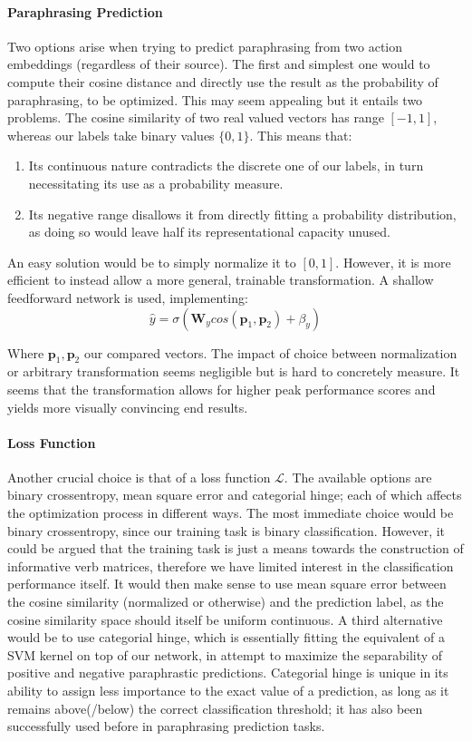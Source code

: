 \documentclass[a4paper,11pt]{article}
\begin{document}
\paragraph{Paraphrasing Prediction}
Two options arise when trying to predict paraphrasing from two action embeddings (regardless of their source). The first and simplest one would to compute their cosine distance and directly use the result as the probability of paraphrasing, to be optimized. This may seem appealing but it entails two problems. The cosine similarity of two real valued vectors has range $[-1,1]$, whereas our labels take binary values $\{0,1\}$. This means that:
\begin{enumerate}
\item Its continuous nature contradicts the discrete one of our labels, in turn necessitating its use as a probability measure. 
\item Its negative range disallows it from directly fitting a probability distribution, as doing so would leave half its representational capacity unused.
\end{enumerate}

An easy solution would be to simply normalize it to $[0,1]$. However, it is more efficient to instead allow a more general, trainable transformation. A shallow feedforward network is used, implementing:
\[
\hat{y} = \sigma(\mathbf{W}_ycos(\mathbf{p}_1,\mathbf{p}_2) + \beta_y) 
\]
 
Where $\mathbf{p}_1, \mathbf{p}_2$ our compared vectors. The impact of choice between normalization or arbitrary transformation seems negligible but is hard to concretely measure. It seems that the transformation allows for higher peak performance scores and yields more visually convincing end results.

\paragraph{Loss Function}
\label{loss}
Another crucial choice is that of a loss function $\mathcal{L}$. The available options are binary crossentropy, mean square error and categorial hinge; each of which affects the optimization process in different ways. The most immediate choice would be binary crossentropy, since our training task is binary classification. However, it could be argued that the training task is just a means towards the construction of informative verb matrices, therefore we have limited interest in the classification performance itself. It would then make sense to use mean square error between the cosine similarity (normalized or otherwise) and the prediction label, as the cosine similarity space should itself be uniform continuous. A third alternative would be to use categorial hinge, which is essentially fitting the equivalent of a SVM kernel on top of our network, in attempt to maximize the separability of positive and negative paraphrastic predictions. Categorial hinge is unique in its ability to assign less importance to the exact value of a prediction, as long as it remains above(/below) the correct classification threshold; it has also been successfully used before in paraphrasing prediction tasks.
\end{document}
